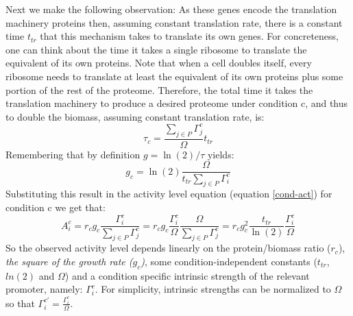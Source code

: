 \documentclass[a4page,notitlepage]{article}
\begin{document}
Next we make the following observation:
As these genes encode the translation machinery proteins then, assuming constant translation rate, there is a constant time $t_{tr}$ that this mechanism takes to translate its own genes.
For concreteness, one can think about the time it takes a single ribosome to translate the equivalent of its own proteins.
Note that when a cell doubles itself, every ribosome needs to translate at least the equivalent of its own proteins plus some portion of the rest of the proteome.
Therefore, the total time it takes the translation machinery to produce a desired proteome under condition c, and thus to double the biomass, assuming constant translation rate, is:
\[\tau_c=\frac{\sum_{j\in P}\Gamma^c_j}{\Omega}t_{tr}\]
Remembering that by  definition $g=\ln(2)/\tau$ yields:
\[g_c=\ln(2)\frac{\Omega}{t_{tr}\sum_{j\in P}\Gamma^c_i}\]
Substituting this result in the activity level equation (equation \ref{cond-act}) for condition c we get that:
\begin{equation}
\label{ind-act}
A^c_i=r_c g_c \frac{\Gamma^c_i}{\sum_{j\in P}\Gamma^c_j}=r_c g_c \frac{\Gamma^c_i}{\Omega}\frac{\Omega}{\sum_{j\in P}\Gamma^c_j}=r_c g_c^2\frac{t_{tr}}{\ln(2)}\frac{\Gamma^c_i}{\Omega}
\end{equation}
So the observed activity level depends linearly on the protein/biomass ratio ($r_c$), \emph{the square of the growth rate ($g_c$)}, some condition-independent constants ($t_{tr}$, $ln(2)$ and $\Omega$) and a condition specific intrinsic strength of the relevant promoter, namely: ${\Gamma^c_i}$.
For simplicity, intrinsic strengths can be normalized to $\Omega$ so that $\Gamma_i^{c'} = \frac{\Gamma^c_i}{\Omega}$.
\end{document}
